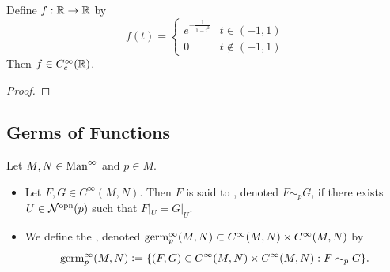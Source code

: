 \documentclass{book}
\begin{document}
\begin{ex}
	Define $f:\mathbb{R} \rightarrow \mathbb{R}$ by 
	\[
	f(t) = 
	\begin{cases}
		e^{-\frac{1}{1-t^2}} & t \in (-1,1)\\
		0 &  t \not \in (-1,1)
	\end{cases}
	\]
	Then $f \in C_c^{\infty}(\mathbb{R})$.
\end{ex}

\begin{proof}
	
\end{proof}


























































\subsection{Germs of Functions}

\begin{defn}
	Let $M, N \in \text{Man}^{\infty}$ and $p \in M$. 
	\begin{itemize}
		\item Let $F, G \in C^{\infty}(M,N)$. Then $F$ is said to , denoted $F \sim_p G$, if there exists $U \in {\mathcal{N}}^{\text{opn}}(p)$ such that $F|_U = G|_U$. 
		\item We define the , denoted $\text{germ}^{\infty}_p(M,N) \subset C^{\infty}(M,N) \times C^{\infty}(M,N)$ by 
		$$\text{germ}^{\infty}_p(M,N) \vcentcolon= \{(F, G) \in C^{\infty}(M,N) \times C^{\infty}(M,N): F \sim_p G \}.$$
	\end{itemize}
\end{defn}
\end{document}

